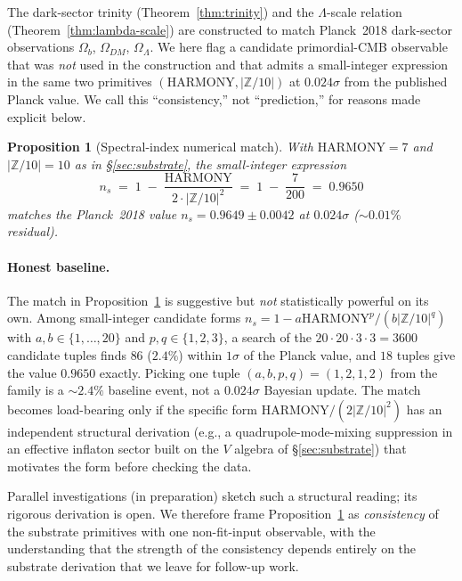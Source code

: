 \documentclass[11pt,reqno]{amsart}
\theoremstyle{plain}
\newtheorem{proposition}[theorem]{Proposition}
\theoremstyle{definition}
\theoremstyle{remark}
\newcommand{\Z}{\mathbb{Z}}
\begin{document}
The dark-sector trinity (Theorem~\ref{thm:trinity}) and the
$\Lambda$-scale relation (Theorem~\ref{thm:lambda-scale}) are
constructed to match Planck~2018 dark-sector observations
$\Omega_b$, $\Omega_{DM}$, $\Omega_\Lambda$. We here flag a
candidate primordial-CMB observable that was \emph{not} used in
the construction and that admits a small-integer expression in
the same two primitives $(\mathrm{HARMONY}, |\Z/10|)$ at
$0.024\sigma$ from the published Planck value. We call this
``consistency,'' not ``prediction,'' for reasons made explicit
below.

\begin{proposition}[Spectral-index numerical match]\label{prop:ns}
With $\mathrm{HARMONY} = 7$ and $|\Z/10| = 10$ as in
\S\ref{sec:substrate}, the small-integer expression
\[
  n_s \;=\; 1 \;-\; \frac{\mathrm{HARMONY}}{2 \cdot |\Z/10|^{2}}
  \;=\; 1 \;-\; \frac{7}{200} \;=\; 0.9650
\]
matches the Planck~2018 value $n_s = 0.9649 \pm 0.0042$
\cite{Planck2018} at $0.024\sigma$ ($\sim 0.01\%$ residual).
\end{proposition}

\paragraph{Honest baseline.}
The match in Proposition~\ref{prop:ns} is suggestive but
\emph{not} statistically powerful on its own. Among small-integer
candidate forms
$n_s = 1 - a \mathrm{HARMONY}^{p} / (b |\Z/10|^{q})$ with
$a, b \in \{1, \dots, 20\}$ and $p, q \in \{1, 2, 3\}$, a search
of the $20 \cdot 20 \cdot 3 \cdot 3 = 3600$ candidate tuples
finds $86$ ($2.4\%$) within $1\sigma$ of the Planck value, and
$18$ tuples give the value $0.9650$ exactly. Picking one tuple
$(a, b, p, q) = (1, 2, 1, 2)$ from the family is a $\sim 2.4\%$
baseline event, not a $0.024\sigma$ Bayesian update. The match
becomes load-bearing only if the specific form
$\mathrm{HARMONY}/(2 |\Z/10|^{2})$ has an independent structural
derivation (e.g., a quadrupole-mode-mixing suppression in an
effective inflaton sector built on the $V$ algebra of
\S\ref{sec:substrate}) that motivates the form before checking
the data.

Parallel investigations (in preparation) sketch such a
structural reading; its rigorous derivation is open. We therefore
frame Proposition~\ref{prop:ns} as \emph{consistency} of the
substrate primitives with one non-fit-input observable, with the
understanding that the strength of the consistency depends entirely
on the substrate derivation that we leave for follow-up work.
\end{document}
